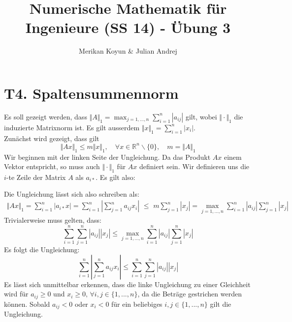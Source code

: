 \documentclass[11pt]{article}
\theoremstyle{plain}
\theoremstyle{definition}
\renewcommand{\a}{\"{a}}
\renewcommand{\o}{\"{o}}
\renewcommand{\u}{\"{u}}
\begin{document}
\title{Numerische Mathematik f\u r Ingenieure (SS 14) - \"{U}bung 3}
\author{Merikan Koyun \& Julian Andrej}
\maketitle

\section*{T4. Spaltensummennorm}
Es soll gezeigt werden, dass $\Vert A\Vert_1 = \max_{j=1,...,n} \sum_{i=1}^n |a_{ij}|$ gilt, wobei $\Vert\cdot\Vert_1$ die induzierte Matrixnorm ist. Es gilt ausserdem $\Vert x \Vert_1 = \sum_{i=1}^n |x_i|$. \\
Zun\a chst wird gezeigt, dass gilt
\begin{equation}
\Vert Ax\Vert_1 \leq m \Vert x\Vert_1, \quad \forall x \in \mathbb{R}^n \backslash \{0\}, \quad m=\Vert A \Vert_1
\label{beh}
\end{equation}
Wir beginnen mit der linken Seite der Ungleichung. Da das Produkt $Ax$ einem Vektor entspricht, so muss auch $\Vert\cdot \Vert_1$ f\u r $Ax$ definiert sein. Wir definieren uns die $i$-te Zeile der Matrix $A$ als $a_{i*}$. Es gilt also:


Die Ungleichung l\a sst sich also schreiben als:
\begin{align*}
\Vert Ax \Vert_1 =  \sum_{i=1}^n |a_{i*}x| = \sum_{i=1}^n \left| \sum_{j=1}^n a_{ij}x_i \right| 
 \,\,\leq\,\, m \sum_{j=1}^n |x_j| = \max_{j=1,...,n} \sum_{i=1}^n |a_{ij}| \sum_{j=1}^n |x_j| \end{align*}
Trivialerweise muss gelten, dass:
\begin{equation}
 \sum_{i=1}^n \sum_{j=1}^n |a_{ij}||x_j| \leq \max_{j=1,...,n} \sum_{i=1}^n |a_{ij}| \sum_{j=1}^n |x_j|
\end{equation}
Es folgt die Ungleichung:
\begin{equation}
\sum_{i=1}^n \left| \sum_{j=1}^n a_{ij}x_i \right|  \leq  \sum_{i=1}^n \sum_{j=1}^n |a_{ij}||x_j|
\end{equation}
Es l\a sst sich unmittelbar erkennen, dass die linke Ungleichung zu einer Gleichheit wird f\u r $a_{ij} \geq 0$ und $x_i \geq 0,\, \forall i,j \in \{1,...,n\}$, da die Betr\a ge gestrichen werden k\o nnen. Sobald $a_{ij} < 0$ oder $x_i < 0$ f\u r ein beliebiges $i,j \in \{1,...,n\}$ gilt die Ungleichung.\\
\end{document}
